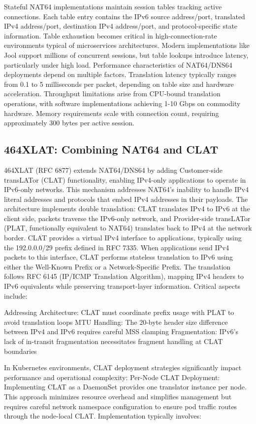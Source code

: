 Stateful NAT64 implementations maintain session tables tracking active connections. Each table entry contains the IPv6 source address/port, translated IPv4 address/port, destination IPv4 address/port, and protocol-specific state information. Table exhaustion becomes critical in high-connection-rate environments typical of microservices architectures. Modern implementations like Jool support millions of concurrent sessions, but table lookups introduce latency, particularly under high load.
Performance characteristics of NAT64/DNS64 deployments depend on multiple factors. Translation latency typically ranges from 0.1 to 5 milliseconds per packet, depending on table size and hardware acceleration. Throughput limitations arise from CPU-bound translation operations, with software implementations achieving 1-10 Gbps on commodity hardware. Memory requirements scale with connection count, requiring approximately 300 bytes per active session.
\subsection{464XLAT: Combining NAT64 and CLAT}
464XLAT (RFC 6877) extends NAT64/DNS64 by adding Customer-side transLATor (CLAT) functionality, enabling IPv4-only applications to operate in IPv6-only networks. This mechanism addresses NAT64's inability to handle IPv4 literal addresses and protocols that embed IPv4 addresses in their payloads. The architecture implements double translation: CLAT translates IPv4 to IPv6 at the client side, packets traverse the IPv6-only network, and Provider-side transLATor (PLAT, functionally equivalent to NAT64) translates back to IPv4 at the network border.
CLAT provides a virtual IPv4 interface to applications, typically using the 192.0.0.0/29 prefix defined in RFC 7335. When applications send IPv4 packets to this interface, CLAT performs stateless translation to IPv6 using either the Well-Known Prefix or a Network-Specific Prefix. The translation follows RFC 6145 (IP/ICMP Translation Algorithm), mapping IPv4 headers to IPv6 equivalents while preserving transport-layer information. Critical aspects include:

Addressing Architecture: CLAT must coordinate prefix usage with PLAT to avoid translation loops
MTU Handling: The 20-byte header size difference between IPv4 and IPv6 requires careful MSS clamping
Fragmentation: IPv6's lack of in-transit fragmentation necessitates fragment handling at CLAT boundaries

In Kubernetes environments, CLAT deployment strategies significantly impact performance and operational complexity:
Per-Node CLAT Deployment: Implementing CLAT as a DaemonSet provides one translator instance per node. This approach minimizes resource overhead and simplifies management but requires careful network namespace configuration to ensure pod traffic routes through the node-local CLAT. Implementation typically involves:

